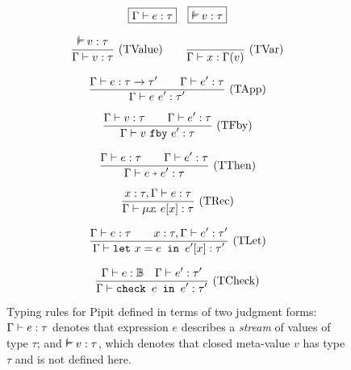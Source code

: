 \begin{figure}
  \[
    \boxed{\typing{\Gamma}{e}{\tau}}
    \quad
    \boxed{\mtyping{}{v}{\tau}}
  \]

  \[
    \ruleIN{
      \mtyping{}{v}{\tau}
    }{
      \typing{\Gamma}{v}{\tau}
    }{TValue}
    \quad
    \ruleAx{\typing{\Gamma}{x}{\Gamma(v)}}{TVar}
  \]

  \[
    \enskip \frac {\displaystyle 
      \Gamma \vdash e : \tau \to \tau'
      \qquad
      \Gamma \vdash e' : \tau
    } {\displaystyle \Gamma \vdash e~e' : \tau'} \  \mbox{(TApp)} \enskip
  \]

  \[
    \enskip \frac {\displaystyle 
      \Gamma \vdash v : \tau
      \qquad
      \Gamma \vdash e' : \tau
    } {\displaystyle 
      \Gamma \vdash v~\texttt{fby}~e' : \tau
    } \  \mbox{(TFby)} \enskip
  \]

  \[
    \ruleIN{
      \typing{\Gamma}{e}{\tau}
      \qquad
      \typing{\Gamma}{e'}{\tau}
    }{\typing{\Gamma}{\xthen{e}{e'}}{\tau}}{TThen}
  \]

  \[
    \enskip \frac {\displaystyle 
      x : \tau, \Gamma \vdash e : \tau
    } {\displaystyle 
      \Gamma \vdash \mu{} x \!.~e[x] : \tau
    } \  \mbox{(TRec)} \enskip
  \]

  \[
    \enskip \frac {\displaystyle 
      \Gamma \vdash e : \tau
      \qquad
      x : \tau, \Gamma \vdash e' : \tau'
    } {\displaystyle 
      \Gamma \vdash \texttt{let}~x = e \texttt{~in~} e'[x] : \tau'
    } \  \mbox{(TLet)} \enskip
  \]

  \[
    \enskip \frac {\displaystyle 
      \Gamma \vdash e : \mathbb{B}
      \quad
      \Gamma \vdash e' : \tau'
    } {\displaystyle 
      \Gamma \vdash \texttt{check~} e \texttt{~in~} e' : \tau'
    } \  \mbox{(TCheck)} \enskip
  \]

  \caption{Typing rules for Pipit defined in terms of two judgment forms: $\Gamma \vdash e : \tau$ denotes that expression $e$ describes a \emph{stream} of values of type $\tau$; and $\mtyping{}{v}{\tau}$, which denotes that closed meta-value $v$ has type $\tau$ and is not defined here.}\label{f:core-typing}
\end{figure}